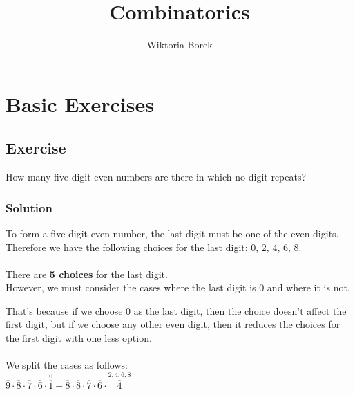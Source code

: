 \documentclass{article}
\title{Combinatorics}
\author{Wiktoria Borek}
\date{}
\begin{document}
\maketitle

\section{Basic Exercises}
\subsection{Exercise}
How many five-digit even numbers are there in which no digit repeats?
\subsubsection*{Solution}
To form a five-digit even number, the last digit must be one of the even digits.\\
Therefore we have the following choices for the last digit: 0, 2, 4, 6, 8.\\
\\
There are \textbf{5 choices} for the last digit.\\
However, we must consider the cases where the last digit is 0 and where it is not.

That's because if we choose 0 as the last digit, then the choice doesn't affect the first digit,
but if we choose any other even digit, then it reduces the choices for the first digit with one less option. \\
\\
We split the cases as follows:\\

$\overset{}{\overline{9}} \cdot \overset{}{\overline{8}} \cdot \overset{}{\overline{7}} \cdot \overset{}{\overline{6}} \cdot \overset{0}{\overline{1}} + \overset{}{\overline{8}} \cdot \overset{}{\overline{8}} \cdot \overset{}{\overline{7}} \cdot \overset{}{\overline{6}} \cdot \overset{2,4,6,8}{\overline{4}}$
\end{document}
